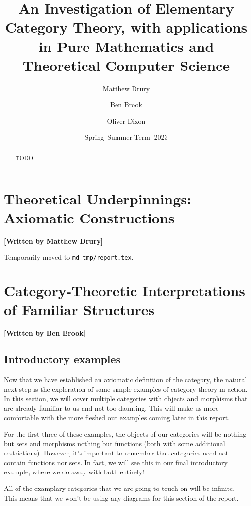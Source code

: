 \documentclass[10pt,a4paper,reqno]{amsart}
\title[An Investigation of Elementary Category Theory]{An Investigation of %
        Elementary Category Theory, with applications in Pure Mathematics and %
        Theoretical Computer Science}
\author{Matthew Drury} \email{\yorkemail{md1499}}
\author{Ben Brook}     \email{\yorkemail{bb1170}}
\author{Oliver Dixon}  \email{\yorkemail{od641}}
\date{Spring--Summer Term, 2023}
\numberwithin{figure}{section}
\begin{document}
\begin{abstract}
        TODO
\end{abstract}
\maketitle
\tableofcontents
\section{Theoretical %
        Underpinnings: Axiomatic Constructions}
\begin{flushright}
        \textbf{[Written by Matthew Drury]}
\end{flushright}

\noindent Temporarily moved to \texttt{md\_tmp/report.tex}.

\section{Category-Theoretic %
        Interpretations of Familiar Structures}
\begin{flushright}
        \textbf{[Written by Ben Brook]} 
\end{flushright}

\subsection{Introductory examples}
Now that we have established an axiomatic definition of the category, the
natural next step is the exploration of some simple examples of category theory
in action. In this section, we will cover multiple categories with objects and
morphisms that are already familiar to us and not too daunting. This will make
us more comfortable with the more fleshed out examples coming later in this
report.

For the first three of these examples, the objects of our categories will be
nothing but sets and morphisms nothing but functions (both with some additional
restrictions). However, it's important to remember that categories need not
contain functions nor sets. In fact, we will see this in our final introductory
example, where we do away with both entirely!

All of the examplary categories that we are going to touch on will be infinite.
This means that we won't be using any diagrams for this section of the report.
\end{document}
